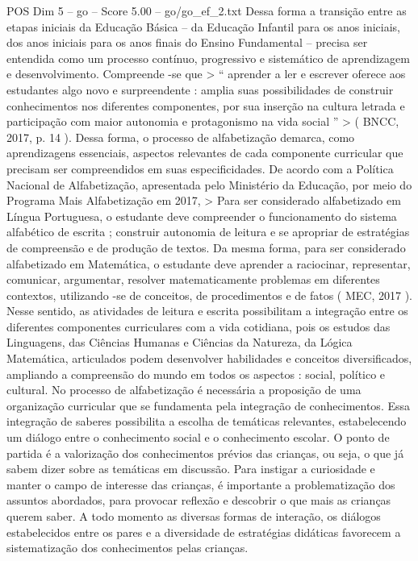 \begin{textsample}{POS Dim 5 – go – Score 5.00 – go/go\_ef\_2.txt}
Dessa forma a transição entre as etapas iniciais da Educação Básica – da Educação Infantil para os anos iniciais, dos anos iniciais para os anos finais do Ensino Fundamental – precisa ser entendida como um processo contínuo, progressivo e sistemático de aprendizagem e desenvolvimento.
Compreende -se que > “ aprender a ler e escrever oferece aos estudantes algo novo e surpreendente : amplia suas possibilidades de construir conhecimentos nos diferentes componentes, por sua inserção na cultura letrada e participação com maior autonomia e protagonismo na vida social ” > ( BNCC, 2017, p. 14 ).
Dessa forma, o processo de alfabetização demarca, como aprendizagens essenciais, aspectos relevantes de cada componente curricular que precisam ser compreendidos em suas especificidades.
De acordo com a Política Nacional de Alfabetização, apresentada pelo Ministério da Educação, por meio do Programa Mais Alfabetização em 2017, > Para ser considerado alfabetizado em Língua Portuguesa, o estudante deve compreender o funcionamento do sistema alfabético de escrita ; construir autonomia de leitura e se apropriar de estratégias de compreensão e de produção de textos.
Da mesma forma, para ser considerado alfabetizado em Matemática, o estudante deve aprender a raciocinar, representar, comunicar, argumentar, resolver matematicamente problemas em diferentes contextos, utilizando -se de conceitos, de procedimentos e de fatos ( MEC, 2017 ).
Nesse sentido, as atividades de leitura e escrita possibilitam a integração entre os diferentes componentes curriculares com a vida cotidiana, pois os estudos das Linguagens, das Ciências Humanas e Ciências da Natureza, da Lógica Matemática, articulados podem desenvolver habilidades e conceitos diversificados, ampliando a compreensão do mundo em todos os aspectos : social, político e cultural.
No processo de alfabetização é necessária a proposição de uma organização curricular que se fundamenta pela integração de conhecimentos.
Essa integração de saberes possibilita a escolha de temáticas relevantes, estabelecendo um diálogo entre o conhecimento social e o conhecimento escolar.
O ponto de partida é a valorização dos conhecimentos prévios das crianças, ou seja, o que já sabem dizer sobre as temáticas em discussão.
Para instigar a curiosidade e manter o campo de interesse das crianças, é importante a problematização dos assuntos abordados, para provocar reflexão e descobrir o que mais as crianças querem saber.
A todo momento as diversas formas de interação, os diálogos estabelecidos entre os pares e a diversidade de estratégias didáticas favorecem a sistematização dos conhecimentos pelas crianças.

\end{textsample}
